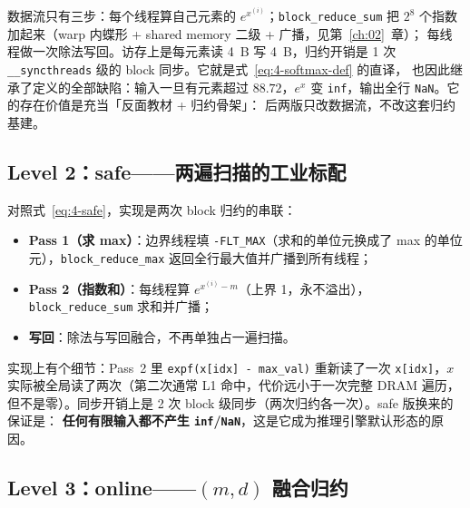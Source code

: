 

数据流只有三步：每个线程算自己元素的 $e^{x^{(i)}}$；\texttt{block\_\allowbreak{}reduce\_\allowbreak{}sum} 把
$2^{8}$ 个指数加起来（warp 内蝶形 + shared memory 二级 + 广播，见第~\ref{ch:02}~章）；
每线程做一次除法写回。访存上是每元素读 4~B 写 4~B，归约开销是 1 次
\texttt{\_\allowbreak{}\_\allowbreak{}syncthreads} 级的 block 同步。它就是式~\ref{eq:4-softmax-def} 的直译，
也因此继承了定义的全部缺陷：输入一旦有元素超过 $88.72$，$e^{x}$ 变
\texttt{inf}，输出全行 \texttt{NaN}。它的存在价值是充当「反面教材 + 归约骨架」：
后两版只改数据流，不改这套归约基建。

\subsection{Level 2：safe——两遍扫描的工业标配}



对照式~\ref{eq:4-safe}，实现是两次 block 归约的串联：
\begin{itemize}
  \item \textbf{Pass 1（求 max）}：边界线程填 \texttt{-FLT\_MAX}（求和的单位元换成了
        max 的单位元），\texttt{block\_\allowbreak{}reduce\_\allowbreak{}max} 返回全行最大值并广播到所有线程；
  \item \textbf{Pass 2（指数和）}：每线程算 $e^{x^{(i)} - m}$（上界 1，永不溢出），
        \texttt{block\_\allowbreak{}reduce\_\allowbreak{}sum} 求和并广播；
  \item \textbf{写回}：除法与写回融合，不再单独占一遍扫描。
\end{itemize}
实现上有个细节：Pass~2 里 \texttt{expf(x[idx] - max\_val)} 重新读了一次
\texttt{x[idx]}，$x$ 实际被全局读了两次（第二次通常 L1 命中，代价远小于一次完整 DRAM 遍历，
但不是零）。同步开销上是 2 次 block 级同步（两次归约各一次）。safe 版换来的保证是：
\textbf{任何有限输入都不产生 \texttt{inf}/\texttt{NaN}}，这是它成为推理引擎默认形态的原因。

\subsection{Level 3：online——$(m,d)$ 融合归约}



